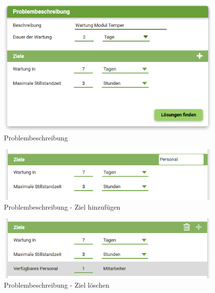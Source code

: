 \begin{figure}[htbp]
\centering
\includegraphics[scale=0.7]{DA_files/Bilder/Konzept/Skizze-Problem-1.png}
\caption{Problembeschreibung}
\label{pic:pD-Problembeschreibung}
\end{figure}

\begin{figure}[htbp]
\centering
\includegraphics[scale=0.7]{DA_files/Bilder/Konzept/Skizze-Problem-Ziel.png}
\caption{Problembeschreibung - Ziel hinzufügen}
\label{pic:pD-Problembeschreibung-Ziel-hinzufuegen}
\end{figure}

\begin{figure}[htbp]
\centering
\includegraphics[scale=0.7]{DA_files/Bilder/Konzept/Skizze-Problem-loeschen.png}
\caption{Problembeschreibung - Ziel löschen}
\label{pic:pD-Problembeschreibung-Ziel-loeschen}
\end{figure}

